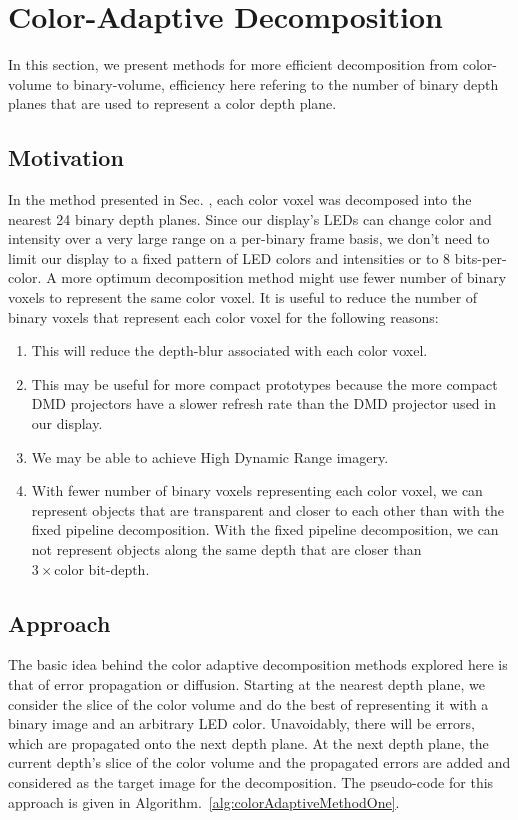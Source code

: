\section{Color-Adaptive Decomposition}

In this section, we present methods for more efficient decomposition from color-volume to binary-volume, efficiency here refering to the number of binary depth planes that are used to represent a color depth plane. 

\subsection{Motivation}
In the method presented in Sec. , each color voxel was decomposed into the nearest 24 binary depth planes. Since our display's LEDs can change color and intensity over a very large range on a per-binary frame basis, we don't need to limit our display to a fixed pattern of LED colors and intensities or to 8 bits-per-color. A more optimum decomposition method might use fewer number of binary voxels to represent the same color voxel. It is useful to reduce the number of binary voxels that represent each color voxel for the following reasons:

\begin{enumerate}
    \item This will reduce the depth-blur associated with each color voxel.
    \item This may be useful for more compact prototypes because the more compact DMD projectors have a slower refresh rate than the DMD projector used in our display.
    \item We may be able to achieve High Dynamic Range imagery.
    \item With fewer number of binary voxels representing each color voxel, we can represent objects that are transparent and closer to each other than with the fixed pipeline decomposition. With the fixed pipeline decomposition, we can not represent objects along the same depth that are closer than $3 \times \text{color bit-depth}$.
\end{enumerate}

\subsection{Approach}
The basic idea behind the color adaptive decomposition methods explored here is that of error propagation or diffusion. 
Starting at the nearest depth plane, we consider the slice of the color volume and do the best of representing it with a binary image and an arbitrary LED color. 
Unavoidably, there will be errors, which are propagated onto the next depth plane. 
At the next depth plane, the current depth's slice of the color volume and the propagated errors are added and considered as the target image for the decomposition.
The pseudo-code for this approach is given in Algorithm.~\ref{alg:colorAdaptiveMethodOne}.

